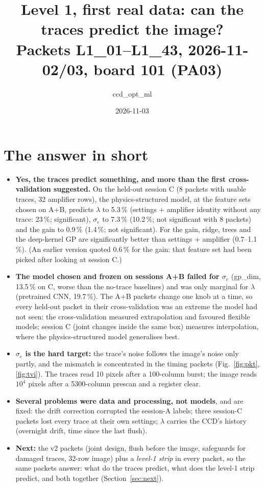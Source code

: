 \documentclass[11pt]{article}
\title{Level 1, first real data: can the traces predict the image?\\[2pt]
\large Packets L1\_01--L1\_43, 2026-11-02/03, board 101 (PA03)}
\author{ccd\_opt\_ml}
\date{2026-11-03}
\begin{document}
\maketitle

\section*{The answer in short}

\begin{itemize}
\item \textbf{Yes, the traces predict something, and more than the first cross-validation suggested.} On the held-out
  session C (8 packets with usable traces, 32 amplifier rows), the physics-structured model, at the feature sets
  chosen on A+B, predicts $\lambda$ to 5.3\,\% (settings + amplifier identity without any trace: 23\,\%; significant),
  $\sigma_e$ to 7.3\,\% (10.2\,\%; not significant with 8 packets) and the gain to 0.9\,\% (1.4\,\%; not significant).
  For the gain, ridge, trees and the deep-kernel GP are significantly better than settings + amplifier (0.7--1.1\,\%).
  (An earlier version quoted 0.6\,\% for the gain: that feature set had been picked after looking at session C.)
\item \textbf{The model chosen and frozen on sessions A+B failed for $\sigma_e$} (gp\_dim, 13.5\,\% on C, worse than
  the no-trace baselines) and was only marginal for $\lambda$ (pretrained CNN, 19.7\,\%). The A+B packets change one
  knob at a time, so every held-out packet in their cross-validation was an extreme the model had not seen: the
  cross-validation measured extrapolation and favoured flexible models; session C (joint changes inside the same box)
  measures interpolation, where the physics-structured model generalises best.
\item \textbf{$\sigma_e$ is the hard target:} the trace's noise follows the image's noise only partly, and the
  mismatch is concentrated in the timing packets (Fig.~\ref{fig:pkt}, \ref{fig:tvi}). The traces read 10 pixels after a
  100-column burst; the image reads $10^4$ pixels after a 5300-column prescan and a register clear.
\item \textbf{Several problems were data and processing, not models}, and are fixed: the drift correction corrupted
  the session-A labels; three session-C packets lost every trace at their own settings; $\lambda$ carries the CCD's
  history (overnight drift, time since the last flush).
\item \textbf{Next:} the v2 packets (joint design, flush before the image, safeguards for damaged traces, 32-row
  image) plus a \emph{level-1 strip} in every packet, so the same packets answer: what do the traces predict, what does
  the level-1 strip predict, and both together (Section~\ref{sec:next}).
\end{itemize}
\end{document}

